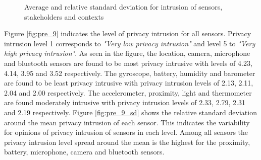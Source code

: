 \begin{figure}[htp]
\hspace{1em}
\newline
\caption{Average and relative standard deviation for intrusion of sensors, stakeholders and contexts }
\label{fig:st3}
\end{figure}

Figure \ref{fig:pre_9} indicates the level of privacy intrusion for all sensors. Privacy intrusion level 1 corresponds to \textit{"Very low privacy intrusion"} and level 5 to \textit{"Very high privacy intrusion"}. As seen in the figure, the location, camera, microphone and bluetooth sensors are found to be most privacy intrusive with levels of 4.23, 4.14, 3.95 and 3.52 respectively. The gyroscope, battery, humidity and barometer are found to be least privacy intrusive with privacy intrusion levels of 2.13, 2.11, 2.04 and 2.00 respectively. The accelerometer, proximity, light and thermometer are found moderately intrusive with privacy intrusion levels of 2.33, 2.79, 2.31 and 2.19 respectively. Figure \ref{fig:pre_9_sd} shows the relative standard deviation around the mean privacy intrusion of each sensor. This indicates the variability for opinions of privacy intrusion of sensors in each level. Among all sensors the privacy intrusion level spread around the mean is the highest for the proximity, battery, microphone, camera and bluetooth sensors.

